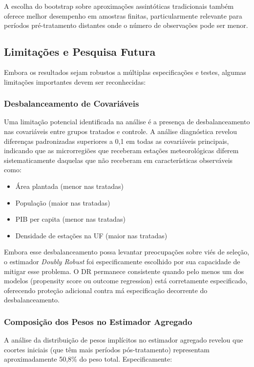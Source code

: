 \documentclass[
	12pt,				%
	oneside,			%
	a4paper,			%
	english,			%
	french,				%
	spanish,			%
	brazil				%
	]{abntex2}
\begin{document}
A escolha do bootstrap sobre aproximações assintóticas tradicionais também oferece melhor desempenho em amostras finitas, particularmente relevante para períodos pré-tratamento distantes onde o número de observações pode ser menor.

\subsection{Limitações e Pesquisa Futura}

Embora os resultados sejam robustos a múltiplas especificações e testes, algumas limitações importantes devem ser reconhecidas:

\subsubsection{Desbalanceamento de Covariáveis}

Uma limitação potencial identificada na análise é a presença de desbalanceamento nas covariáveis entre grupos tratados e controle. A análise diagnóstica revelou diferenças padronizadas superiores a 0,1 em todas as covariáveis principais, indicando que as microrregiões que receberam estações meteorológicas diferem sistematicamente daquelas que não receberam em características observáveis como:

\begin{itemize}
\item Área plantada (menor nas tratadas)
\item População (maior nas tratadas)
\item PIB per capita (menor nas tratadas)
\item Densidade de estações na UF (maior nas tratadas)
\end{itemize}

Embora esse desbalanceamento possa levantar preocupações sobre viés de seleção, o estimador \textit{Doubly Robust} foi especificamente escolhido por sua capacidade de mitigar esse problema. O DR permanece consistente quando pelo menos um dos modelos (propensity score ou outcome regression) está corretamente especificado, oferecendo proteção adicional contra má especificação decorrente do desbalanceamento.

\subsubsection{Composição dos Pesos no Estimador Agregado}

A análise da distribuição de pesos implícitos no estimador agregado revelou que coortes iniciais (que têm mais períodos pós-tratamento) representam aproximadamente 50,8\% do peso total. Especificamente:
\end{document}
